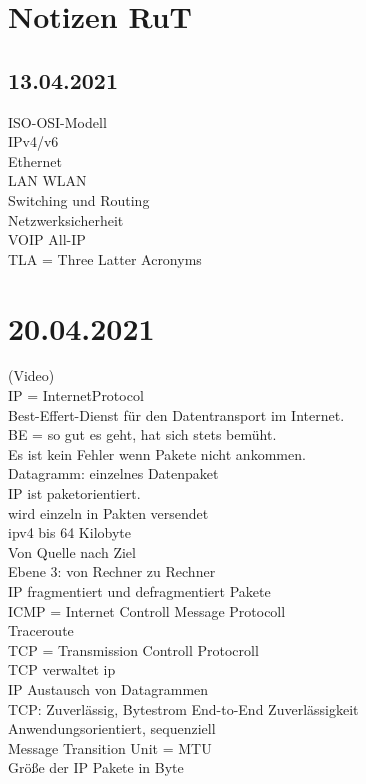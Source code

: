 \documentclass{article}
\begin{document}
	\section*{Notizen RuT}
	\subsection*{13.04.2021}
	ISO-OSI-Modell \\
	IPv4/v6 \\
	Ethernet \\
	LAN WLAN \\
	Switching und Routing \\
	Netzwerksicherheit \\
	VOIP All-IP \\
	TLA = Three Latter Acronyms \\
	\section*{20.04.2021}
	(Video) \\
	IP = InternetProtocol \\
	Best-Effert-Dienst für den Datentransport im Internet. \\
	BE = so gut es geht, hat sich stets bemüht. \\
	Es ist kein Fehler wenn Pakete nicht ankommen. \\
	Datagramm: einzelnes Datenpaket \\
	IP ist paketorientiert. \\
	wird einzeln in Pakten versendet \\
	ipv4 bis 64 Kilobyte \\
	Von Quelle nach Ziel \\
	Ebene 3: von Rechner zu Rechner \\
	IP fragmentiert und defragmentiert Pakete \\
	ICMP = Internet Controll Message Protocoll \\
	Traceroute \\
	TCP = Transmission Controll Protocroll \\
	TCP verwaltet ip \\
	IP Austausch von Datagrammen \\
	TCP: Zuverlässig, Bytestrom End-to-End Zuverlässigkeit \\
	Anwendungsorientiert, sequenziell \\
	Message Transition Unit = MTU \\
	Größe der IP Pakete in Byte \\
\end{document}
